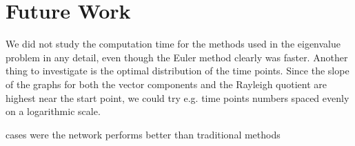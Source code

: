 \section{Future Work}\label{sec:Future}

We did not study the computation time for the methods used in the eigenvalue problem in any detail, even though the Euler method clearly was faster. Another thing to investigate is the optimal distribution of the time points. Since the slope of the graphs for both the vector components and the Rayleigh quotient are highest near the start point, we could try e.g. time points numbers spaced evenly on a logarithmic scale.

cases were the network performs better than traditional methods